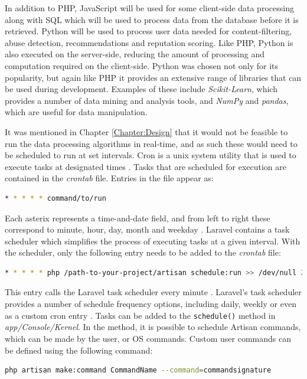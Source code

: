 In addition to PHP, JavaScript will be used for some client-side data processing along with SQL which will be used to process data from the database before it is retrieved. Python will be used to process user data needed for content-filtering, abuse detection, recommendations and reputation scoring. Like PHP, Python is also executed on the server-side, reducing the amount of processing and computation required on the client-side. Python was chosen not only for its popularity, but again like PHP it provides an extensive range of libraries that can be used during development. Examples of these include \emph{Scikit-Learn}, which provides a number of data mining and analysis tools, and \emph{NumPy} and \emph{pandas}, which are useful for data manipulation.

It was mentioned in Chapter \ref{Chapter:Design} that it would not be feasible to run the data processing algorithms in real-time, and as such these would need to be scheduled to run at set intervals. Cron is a unix system utility that is used to execute tasks at designated times \cite{Ubuntu:Cron}. Tasks that are scheduled for execution are contained in the \textit{crontab} file. Entries in the file appear as:
\begin{lstlisting}[language=bash]
* * * * * command/to/run
\end{lstlisting}

Each asterix represents a time-and-date field, and from left to right these correspond to minute, hour, day, month and weekday \cite{Ubuntu:Cron}. Laravel contains a task scheduler which simplifies the process of executing tasks at a given interval. With the scheduler, only the following entry needs to be added to the \textit{crontab} file:

\begin{lstlisting}[language=bash]
* * * * * php /path-to-your-project/artisan schedule:run >> /dev/null 2>&1
\end{lstlisting}

This entry calls the Laravel task scheduler every minute \cite{Laravel:Scheduling}. Laravel's task scheduler provides a number of schedule frequency options, including daily, weekly or even as a custom cron entry \cite{Laravel:Scheduling}. Tasks can be added to the \texttt{schedule()} method in \textit{app/Console/Kernel}. In the method, it is possible to schedule Artisan commands, which can be made by the user, or OS commands. Custom user commands can be defined using the following command:

\begin{lstlisting}[language=bash]
php artisan make:command CommandName --command=commandsignature
\end{lstlisting}


